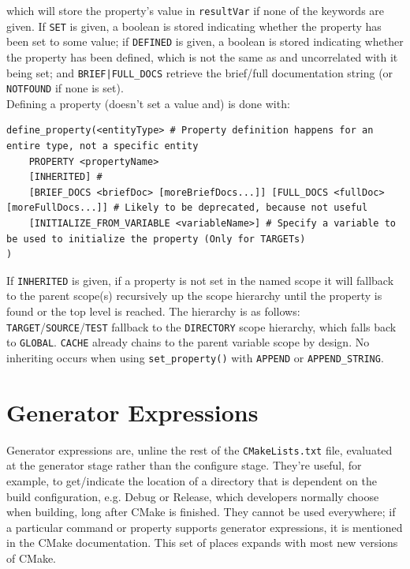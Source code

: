 \documentclass[table, xcdraw]{article}%
\begin{document}
which will store the property's value in \texttt{resultVar} if none of the keywords are given. If \texttt{SET} is given, a boolean is stored indicating whether the property has been set to some value; if \texttt{DEFINED} is given, a boolean is stored indicating whether the property has been defined, which is not the same as and uncorrelated with it being set; and \texttt{BRIEF|FULL_DOCS} retrieve the brief/full documentation string (or \texttt{NOTFOUND} if none is set).\\
Defining a property (doesn't set a value and) is done with:

\begin{verbatim}
define_property(<entityType> # Property definition happens for an entire type, not a specific entity
    PROPERTY <propertyName>
    [INHERITED] # 
    [BRIEF_DOCS <briefDoc> [moreBriefDocs...]] [FULL_DOCS <fullDoc> [moreFullDocs...]] # Likely to be deprecated, because not useful
    [INITIALIZE_FROM_VARIABLE <variableName>] # Specify a variable to be used to initialize the property (Only for TARGETs)
)
\end{verbatim}

If \texttt{INHERITED} is given, if a property is not set in the named scope it will fallback to the parent scope(s) recursively up the scope hierarchy until the property is found or the top level is reached. The hierarchy is as follows: \texttt{TARGET}/\texttt{SOURCE}/\texttt{TEST} fallback to the \texttt{DIRECTORY} scope hierarchy, which falls back to \texttt{GLOBAL}. \texttt{CACHE} already chains to the parent variable scope by design. No inheriting occurs when using \texttt{set_property()} with \texttt{APPEND} or \texttt{APPEND_STRING}.

\section{Generator Expressions}

Generator expressions are, unline the rest of the \texttt{CMakeLists.txt} file, evaluated at the generator stage rather than the configure stage. They're useful, for example, to get/indicate the location of a directory that is dependent on the build configuration, e.g. Debug or Release, which developers normally choose when building, long after CMake is finished. They cannot be used everywhere; if a particular command or property supports generator expressions, it is mentioned in the CMake documentation. This set of places expands with most new versions of CMake.
\end{document}
